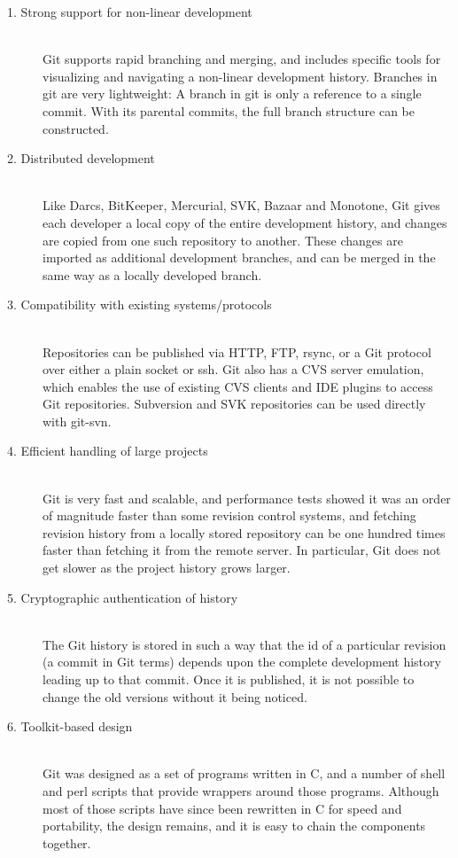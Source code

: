 \begin{description}

\item[1. Strong support for non-linear development] \hfill \\
  Git supports rapid branching and merging, and includes specific
  tools for visualizing and navigating a non-linear development
  history. Branches in git are very lightweight: A branch in git is
  only a reference to a single commit. With its parental commits, the
  full branch structure can be constructed.

\item[2. Distributed development] \hfill \\
  Like Darcs, BitKeeper, Mercurial, SVK, Bazaar and Monotone, Git
  gives each developer a local copy of the entire development history,
  and changes are copied from one such repository to another. These
  changes are imported as additional development branches, and can be
  merged in the same way as a locally developed branch.

\item[3. Compatibility with existing systems/protocols] \hfill \\
  Repositories can be published via HTTP, FTP, rsync, or a Git
  protocol over either a plain socket or ssh. Git also has a CVS
  server emulation, which enables the use of existing CVS clients and
  IDE plugins to access Git repositories. Subversion and SVK
  repositories can be used directly with git-svn.

\item[4. Efficient handling of large projects] \hfill \\
  Git is very fast and scalable, and performance tests showed it was
  an order of magnitude faster than some revision control systems, and
  fetching revision history from a locally stored repository can be
  one hundred times faster than fetching it from the remote server. In
  particular, Git does not get slower as the project history grows
  larger.

\item[5. Cryptographic authentication of history] \hfill \\
  The Git history is stored in such a way that the id of a particular
  revision (a commit in Git terms) depends upon the complete
  development history leading up to that commit. Once it is published,
  it is not possible to change the old versions without it being
  noticed.

\item[6. Toolkit-based design] \hfill \\
  Git was designed as a set of programs written in C, and a number of
  shell and perl scripts that provide wrappers around those programs.
  Although most of those scripts have since been rewritten in C for
  speed and portability, the design remains, and it is easy to chain
  the components together.


\end{description}
